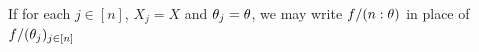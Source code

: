 \begin{note}
	If for each $j \in [n]$, $X_j = X$ and $\theta_j = \theta$, we may write $f/(n:\theta)$ in place of $f/(\theta_j)_{j \in [n]}$
\end{note}

















































































